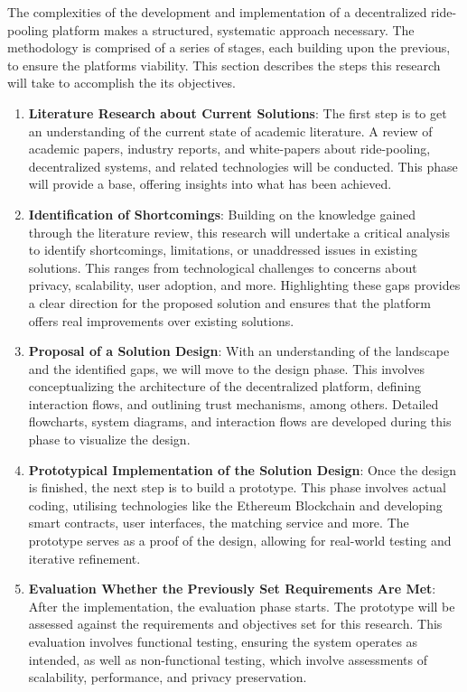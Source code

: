 The complexities of the development and implementation of a decentralized ride-pooling platform makes a structured, systematic approach necessary. The methodology is comprised of a series of stages, each building upon the previous, to ensure the platforms viability. This section describes the steps this research will take to accomplish the its objectives.

\begin{enumerate}
    \item \textbf{Literature Research about Current Solutions}: 
    The first step is to get an understanding of the current state of academic literature. A review of academic papers, industry reports, and white-papers about ride-pooling, decentralized systems, and related technologies will be conducted. This phase will provide a base, offering insights into what has been achieved.

    \item \textbf{Identification of Shortcomings}: 
    Building on the knowledge gained through the literature review, this research will undertake a critical analysis to identify shortcomings, limitations, or unaddressed issues in existing solutions. This ranges from technological challenges to concerns about privacy, scalability, user adoption, and more. Highlighting these gaps provides a clear direction for the proposed solution and ensures that the platform offers real improvements over existing solutions.

    \item \textbf{Proposal of a Solution Design}:
    With an understanding of the landscape and the identified gaps, we will move to the design phase. This involves conceptualizing the architecture of the decentralized platform, defining interaction flows, and outlining trust mechanisms, among others. Detailed flowcharts, system diagrams, and interaction flows are developed during this phase to visualize the design.

    \item \textbf{Prototypical Implementation of the Solution Design}: 
    Once the design is finished, the next step is to build a prototype. This phase involves actual coding, utilising technologies like the Ethereum Blockchain and developing smart contracts, user interfaces, the matching service and more. The prototype serves as a proof of the design, allowing for real-world testing and iterative refinement.

    \item \textbf{Evaluation Whether the Previously Set Requirements Are Met}: 
After the implementation, the evaluation phase starts. The prototype will be assessed against the requirements and objectives set for this research. This evaluation involves functional testing, ensuring the system operates as intended, as well as non-functional testing, which involve assessments of scalability, performance, and privacy preservation.


\end{enumerate}
